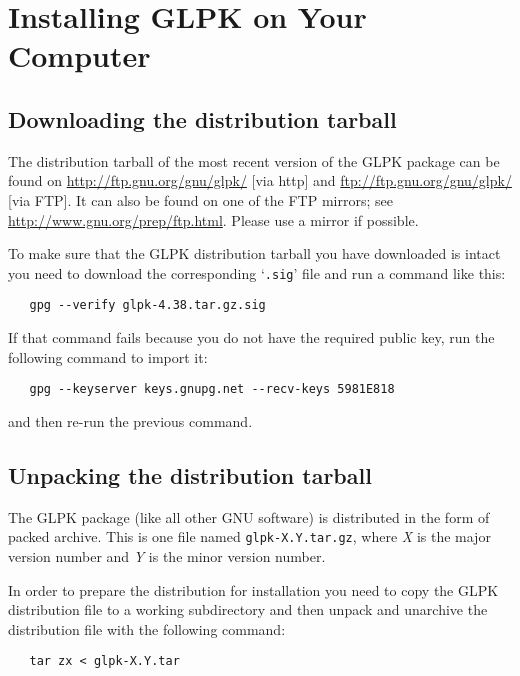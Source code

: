 
\chapter{Installing GLPK on Your Computer}
\label{install}

\section{Downloading the distribution tarball}

The distribution tarball of the most recent version of the GLPK
package can be found on \url{http://ftp.gnu.org/gnu/glpk/} [via http]
and \url{ftp://ftp.gnu.org/gnu/glpk/} [via FTP]. It can also be found
on one of the FTP mirrors; see \url{http://www.gnu.org/prep/ftp.html}.
Please use a mirror if possible.

To make sure that the GLPK distribution tarball you have downloaded is
intact you need to download the corresponding `\verb|.sig|' file and
run a command like this:

\begin{verbatim}
   gpg --verify glpk-4.38.tar.gz.sig
\end{verbatim}

\noindent
If that command fails because you do not have the required public key,
run the following command to import it:

\begin{verbatim}
   gpg --keyserver keys.gnupg.net --recv-keys 5981E818
\end{verbatim}

\noindent
and then re-run the previous command.

\section{Unpacking the distribution tarball}

The GLPK package (like all other GNU software) is distributed in the
form of packed archive. This is one file named \verb|glpk-X.Y.tar.gz|,
where {\it X} is the major version number and {\it Y} is the minor
version number.

In order to prepare the distribution for installation you need to copy
the GLPK distribution file to a working subdirectory and then unpack
and unarchive the distribution file with the following command:

\begin{verbatim}
   tar zx < glpk-X.Y.tar
\end{verbatim}

